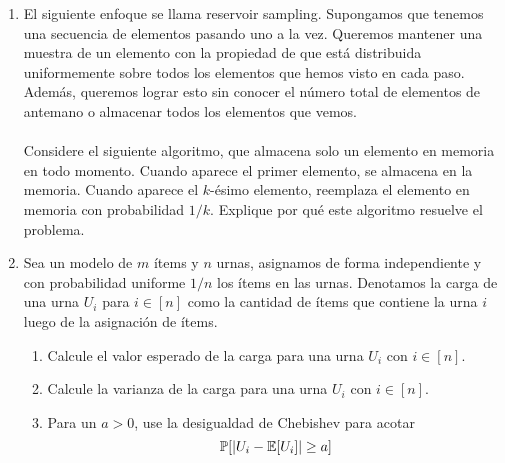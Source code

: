 \begin{problema}{1}
	\begin{enumerate}[label=\arabic*.]
		\item El siguiente enfoque se llama reservoir sampling. Supongamos que tenemos una secuencia
de elementos pasando uno a la vez. Queremos mantener una muestra de un elemento con
la propiedad de que está distribuida uniformemente sobre todos los elementos que hemos
visto en cada paso. Además, queremos lograr esto sin conocer el número total de elementos
de antemano o almacenar todos los elementos que vemos. \\
\\
Considere el siguiente algoritmo, que almacena solo un elemento en memoria en todo
momento. Cuando aparece el primer elemento, se almacena en la memoria. Cuando aparece
el $k$-ésimo elemento, reemplaza el elemento en memoria con probabilidad $1/k$. Explique
por qué este algoritmo resuelve el problema.
\item Sea un modelo de $m$ ítems y $n$ urnas, asignamos de forma independiente y con probabilidad uniforme $1/n$ los ítems en las urnas. Denotamos la carga de una urna $U_i$ para $i \in [n]$ como la cantidad de ítems que contiene la urna $i$ luego de la asignación de ítems.
	\begin{enumerate}[label=\alph*)]
		\item Calcule el valor esperado de la carga para una urna $U_i$ con $i \in [n]$.
		\item Calcule la varianza de la carga para una urna $U_i$ con $i \in [n]$.
		\item Para un $a > 0$, use la desigualdad de Chebishev para acotar
			\[
				\mathbb{P}[|U_i - \mathbb{E}[U_i]| \geq a]
			\]
		
	\end{enumerate}
	\end{enumerate}
\end{problema}
